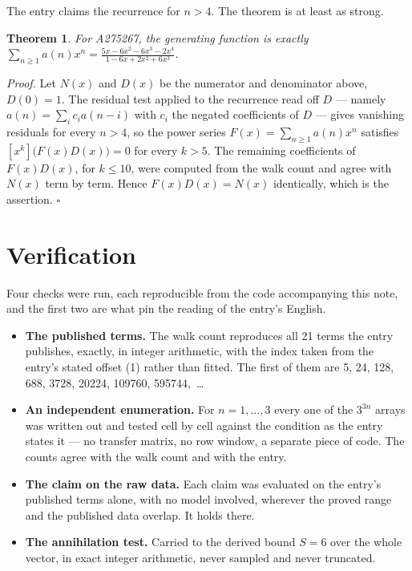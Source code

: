 \documentclass[11pt]{article}
\newtheorem{theorem}{Theorem}
\theoremstyle{definition}
\begin{document}
The entry claims the recurrence for $n > 4$. The theorem is at least as strong.

\begin{theorem} For A275267, the generating function is exactly $\sum_{n\ge 1} a(n)x^n = \frac{5x - 6x^{2} - 6x^{3} - 2x^{4}}{1 - 6x + 2x^{2} + 6x^{3}}$.\end{theorem}

{\itshape Proof.} Let $N(x)$ and $D(x)$ be the numerator and denominator above, $D(0)=1$. The residual test applied to the recurrence read off $D$ --- namely $a(n) = \sum_i c_i a(n-i)$ with $c_i$ the negated coefficients of $D$ --- gives vanishing residuals for every $n > 4$, so the power series $F(x)=\sum_{n\ge 1}a(n)x^n$ satisfies $[x^k]\bigl(F(x)D(x)\bigr) = 0$ for every $k > 5$. The remaining coefficients of $F(x)D(x)$, for $k \le 10$, were computed from the walk count and agree with $N(x)$ term by term. Hence $F(x)D(x) = N(x)$ identically, which is the assertion. $\square$

\section{Verification}

Four checks were run, each reproducible from the code accompanying this note, and the first two are what pin the reading of the entry's English.

\begin{itemize}

\item {\bfseries The published terms.} The walk count reproduces all 21 terms the entry publishes, exactly, in integer arithmetic, with the index taken from the entry's stated offset (1) rather than fitted. The first of them are 5, 24, 128, 688, 3728, 20224, 109760, 595744,~\dots

\item {\bfseries An independent enumeration.} For $n = 1,\dots,3$ every one of the $3^{3n}$ arrays was written out and tested cell by cell against the condition as the entry states it --- no transfer matrix, no row window, a separate piece of code. The counts agree with the walk count and with the entry.

\item {\bfseries The claim on the raw data.} Each claim was evaluated on the entry's published terms alone, with no model involved, wherever the proved range and the published data overlap. It holds there.

\item {\bfseries The annihilation test.} Carried to the derived bound $S = 6$ over the whole vector, in exact integer arithmetic, never sampled and never truncated.

\end{itemize}
\end{document}
